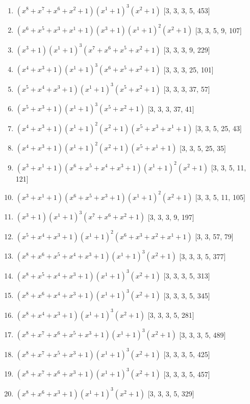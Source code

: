 \documentclass[10pt,twocolumn]{article}
\begin{document}
\begin{enumerate}
\item $(x^{8} + x^{7} + x^{6} + x^{2} + 1)(x^{1} + 1)^{3}(x^{2} + 1)$  [3, 3, 3, 5, 453]
\item $(x^{6} + x^{5} + x^{3} + x^{1} + 1)(x^{3} + 1)(x^{1} + 1)^{2}(x^{2} + 1)$  [3, 3, 5, 9, 107]
\item $(x^{3} + 1)(x^{1} + 1)^{3}(x^{7} + x^{6} + x^{5} + x^{2} + 1)$  [3, 3, 3, 9, 229]
\item $(x^{4} + x^{3} + 1)(x^{1} + 1)^{3}(x^{6} + x^{5} + x^{2} + 1)$  [3, 3, 3, 25, 101]
\item $(x^{5} + x^{4} + x^{3} + 1)(x^{1} + 1)^{3}(x^{5} + x^{2} + 1)$  [3, 3, 3, 37, 57]
\item $(x^{5} + x^{3} + 1)(x^{1} + 1)^{3}(x^{5} + x^{2} + 1)$  [3, 3, 3, 37, 41]
\item $(x^{4} + x^{3} + 1)(x^{1} + 1)^{2}(x^{2} + 1)(x^{5} + x^{3} + x^{1} + 1)$  [3, 3, 5, 25, 43]
\item $(x^{4} + x^{3} + 1)(x^{1} + 1)^{2}(x^{2} + 1)(x^{5} + x^{1} + 1)$  [3, 3, 5, 25, 35]
\item $(x^{3} + x^{1} + 1)(x^{6} + x^{5} + x^{4} + x^{3} + 1)(x^{1} + 1)^{2}(x^{2} + 1)$  [3, 3, 5, 11, 121]
\item $(x^{3} + x^{1} + 1)(x^{6} + x^{5} + x^{3} + 1)(x^{1} + 1)^{2}(x^{2} + 1)$  [3, 3, 5, 11, 105]
\item $(x^{3} + 1)(x^{1} + 1)^{3}(x^{7} + x^{6} + x^{2} + 1)$  [3, 3, 3, 9, 197]
\item $(x^{5} + x^{4} + x^{3} + 1)(x^{1} + 1)^{2}(x^{6} + x^{3} + x^{2} + x^{1} + 1)$  [3, 3, 57, 79]
\item $(x^{8} + x^{6} + x^{5} + x^{4} + x^{3} + 1)(x^{1} + 1)^{3}(x^{2} + 1)$  [3, 3, 3, 5, 377]
\item $(x^{8} + x^{5} + x^{4} + x^{3} + 1)(x^{1} + 1)^{3}(x^{2} + 1)$  [3, 3, 3, 5, 313]
\item $(x^{8} + x^{6} + x^{4} + x^{3} + 1)(x^{1} + 1)^{3}(x^{2} + 1)$  [3, 3, 3, 5, 345]
\item $(x^{8} + x^{4} + x^{3} + 1)(x^{1} + 1)^{3}(x^{2} + 1)$  [3, 3, 3, 5, 281]
\item $(x^{8} + x^{7} + x^{6} + x^{5} + x^{3} + 1)(x^{1} + 1)^{3}(x^{2} + 1)$  [3, 3, 3, 5, 489]
\item $(x^{8} + x^{7} + x^{5} + x^{3} + 1)(x^{1} + 1)^{3}(x^{2} + 1)$  [3, 3, 3, 5, 425]
\item $(x^{8} + x^{7} + x^{6} + x^{3} + 1)(x^{1} + 1)^{3}(x^{2} + 1)$  [3, 3, 3, 5, 457]
\item $(x^{8} + x^{6} + x^{3} + 1)(x^{1} + 1)^{3}(x^{2} + 1)$  [3, 3, 3, 5, 329]

\end{enumerate}
\end{document}
